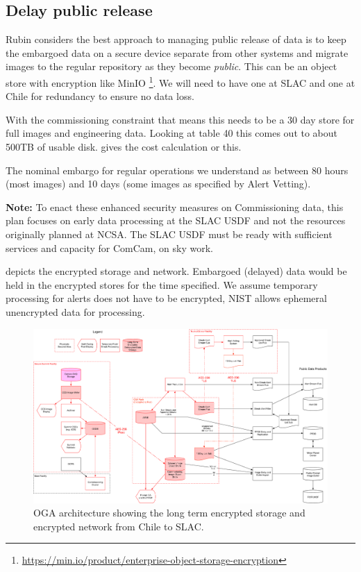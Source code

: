 
\subsection{Delay public release} \label{sec:3delay}

Rubin considers the best approach to managing public release of data is to keep the embargoed data on a secure device separate from other systems and migrate images to the regular repository as they become \emph{public}.
This can be an object store with encryption like MinIO \footnote{\url{ https://min.io/product/enterprise-object-storage-encryption}}.
We will need to have one at SLAC and one at Chile for redundancy to ensure no data loss.

With the commissioning constraint that means this needs to be a 30 day store  for full images and engineering data.
Looking at 
table 40 this comes out to about 500TB of usable disk.
 gives the cost calculation or this.

The nominal embargo for regular operations we understand as between 80 hours (most images) and 10 days (some images as specified by Alert Vetting).




{\bf Note:} To enact these enhanced security measures on Commissioning data, this plan focuses on early data processing at the SLAC USDF and not the resources originally planned at NCSA. The SLAC USDF must be ready with sufficient services and capacity for ComCam, on sky work.

 depicts the encrypted storage and network. Embargoed (delayed) data would be held in the encrypted stores for the time specified.
We assume temporary processing for alerts does not have to be encrypted, NIST allows ephemeral unencrypted data for processing.

\begin{figure}
\begin{centering}
\includegraphics[width=\textwidth]{OGA_Diagram}
	\caption{ OGA architecture  showing the long term encrypted storage and encrypted network from Chile to SLAC. \label{fig:arch}}
\end{centering}
\end{figure}
